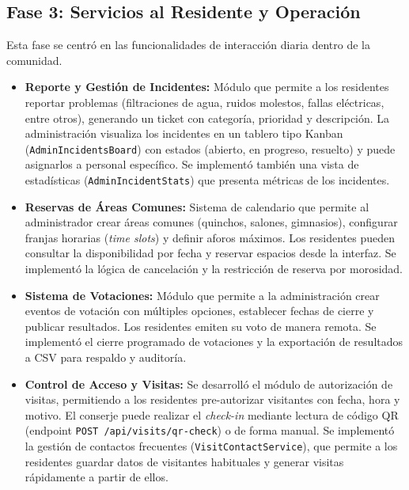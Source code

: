 \subsection{Fase 3: Servicios al Residente y Operación}
Esta fase se centró en las funcionalidades de interacción diaria dentro de la comunidad.
\begin{itemize}
    \item \textbf{Reporte y Gestión de Incidentes:} Módulo que permite a los residentes reportar problemas (filtraciones de agua, ruidos molestos, fallas eléctricas, entre otros), generando un ticket con categoría, prioridad y descripción. La administración visualiza los incidentes en un tablero tipo Kanban (\texttt{AdminIncidentsBoard}) con estados (abierto, en progreso, resuelto) y puede asignarlos a personal específico. Se implementó también una vista de estadísticas (\texttt{AdminIncidentStats}) que presenta métricas de los incidentes.
    \item \textbf{Reservas de Áreas Comunes:} Sistema de calendario que permite al administrador crear áreas comunes (quinchos, salones, gimnasios), configurar franjas horarias (\textit{time slots}) y definir aforos máximos. Los residentes pueden consultar la disponibilidad por fecha y reservar espacios desde la interfaz. Se implementó la lógica de cancelación y la restricción de reserva por morosidad.
    \item \textbf{Sistema de Votaciones:} Módulo que permite a la administración crear eventos de votación con múltiples opciones, establecer fechas de cierre y publicar resultados. Los residentes emiten su voto de manera remota. Se implementó el cierre programado de votaciones y la exportación de resultados a CSV para respaldo y auditoría.
    \item \textbf{Control de Acceso y Visitas:} Se desarrolló el módulo de autorización de visitas, permitiendo a los residentes pre-autorizar visitantes con fecha, hora y motivo. El conserje puede realizar el \textit{check-in} mediante lectura de código QR (endpoint \texttt{POST /api/visits/qr-check}) o de forma manual. Se implementó la gestión de contactos frecuentes (\texttt{VisitContactService}), que permite a los residentes guardar datos de visitantes habituales y generar visitas rápidamente a partir de ellos.
\end{itemize}

